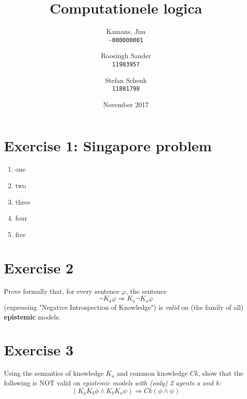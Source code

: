 \documentclass{article}
\title{Computationele logica}
\author{
    Kamans, Jim\\
    \texttt{-000000001}
    \and
    Roosingh Sander\\
    \texttt{11983957}
    \and
    \small Stefan Schenk\\
    \texttt{11881798}
}
\date{November 2017}
\begin{document}
\maketitle

\section{Exercise 1: Singapore problem}

\begin{enumerate}[label=(\alph*)]
    \item one
    \item two
    \item three
    \item four
    \item five
\end{enumerate}

\section{Exercise 2}
Prove formally that, for every sentence \(\varphi\), the sentence
\[\neg K_{a}\varphi \Rightarrow K_{a}\neg K_{a}\varphi\]
(expressing "Negative Introspection of Knowledge") is \textit{valid} on (the family of all) \textbf{epistemic} models.

\section{Exercise 3}
Using the semantics of knowledge \(K_{a}\) and common knowledge \(Ck\), show that the following is NOT valid on \textit{epistemic models with (only) 2 agents a and b:}
\[(K_{a}K_{b}\phi\wedge K_{b}K_{a}\psi) \Rightarrow Ck(\phi\wedge\psi)\]
\end{document}

